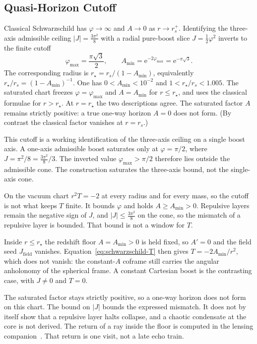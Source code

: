 \documentclass[a4paper]{article}
\newcommand{\Jbound}{\frac{3\pi^2}{8}}
\begin{document}
\subsection{Quasi-Horizon Cutoff}
\label{subsec:quasi-horizon}

Classical Schwarzschild has $\varphi\to\infty$ and $A\to 0$ as $r\to r_s^+$. Identifying the three-axis admissible ceiling $|J|=\Jbound$ with a radial pure-boost slice $J=\tfrac12\varphi^2$ inverts to the finite cutoff
\[
\varphi_{\max}=\frac{\pi\sqrt{3}}{2},\qquad A_{\min}=\mathrm{e}^{-2\varphi_{\max}}=\mathrm{e}^{-\pi\sqrt{3}}.
\]
The corresponding radius is $r_\star=r_s/(1-A_{\min})$, equivalently $r_\star/r_s=(1-A_{\min})^{-1}$. One has $0<A_{\min}<10^{-2}$ and $1<r_\star/r_s<1.005$. The saturated chart freezes $\varphi=\varphi_{\max}$ and $A=A_{\min}$ for $r\le r_\star$, and uses the classical formulae for $r>r_\star$. At $r=r_\star$ the two descriptions agree. The saturated factor $A$ remains strictly positive: a true one-way horizon $A=0$ does not form. (By contrast the classical factor vanishes at $r=r_s$.)

This cutoff is a working identification of the three-axis ceiling on a single boost axis. A one-axis admissible boost saturates only at $\varphi=\pi/2$, where $J=\pi^2/8=\Jbound/3$. The inverted value $\varphi_{\max}>\pi/2$ therefore lies outside the admissible cone. The construction saturates the three-axis bound, not the single-axis cone.

On the vacuum chart $r^2 T=-2$ at every radius and for every mass, so the cutoff is not what keeps $T$ finite. It bounds $\varphi$ and holds $A\ge A_{\min}>0$. Repulsive layers remain the negative sign of $J$, and $|J|\le\Jbound$ on the cone, so the mismatch of a repulsive layer is bounded. That bound is not a window for $T$.

Inside $r\le r_\star$ the redshift floor $A=A_{\min}>0$ is held fixed, so $A'=0$ and the field seed $J_{\mathrm{field}}$ vanishes. Equation~\eqref{eq:schwarzschild-T} then gives $T=-2A_{\min}/r^2$, which does not vanish: the constant-$A$ coframe still carries the angular anholonomy of the spherical frame. A constant Cartesian boost is the contrasting case, with $J\neq 0$ and $T=0$.

The saturated factor stays strictly positive, so a one-way horizon does not form on this chart. The bound on \(|J|\) bounds the expressed mismatch. It does not by itself show that a repulsive layer halts collapse, and a chaotic condensate at the core is not derived. The return of a ray inside the floor is computed in the lensing companion~\cite{dst-lensing}. That return is one visit, not a late echo train.
\end{document}
